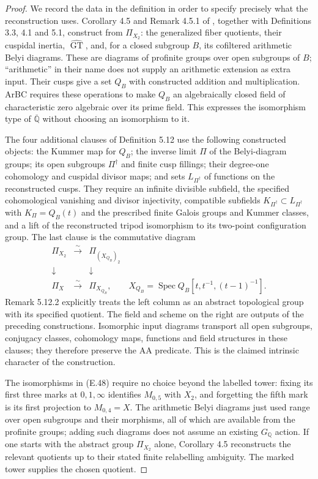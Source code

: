 \begin{proof}
We record the data in the definition in order to specify
precisely what the reconstruction uses.  Corollary 4.5 and
Remark 4.5.1 of \cite{ET_HMT2025}, together with
Definitions 3.3, 4.1 and 5.1, construct from $\Pi_{X_2}$:
the generalized fiber quotients, their cuspidal inertia,
$\widehat{\operatorname{GT}}$, and, for a closed subgroup
$B$, its cofiltered arithmetic Belyi diagrams.  These are
diagrams of profinite groups over open subgroups of $B$;
``arithmetic'' in their name does not supply an arithmetic
extension as extra input.  Their cusps give a set $Q_B$
with constructed addition and multiplication.  ArBC requires
these operations to make $Q_B$ an algebraically closed field
of characteristic zero algebraic over its prime field.
This expresses the isomorphism type of
$\overline{\mathbb Q}$ without choosing an isomorphism to it.

The four additional clauses of Definition 5.12 use the
following constructed objects: the Kummer map for $Q_B$;
the inverse limit $\Pi$ of the Belyi-diagram groups; its
open subgroups $\Pi^\dagger$ and finite cusp fillings;
their degree-one cohomology and cuspidal divisor maps; and
sets $L_{\Pi^\dagger}$ of functions on the reconstructed
cusps.  They require an infinite divisible subfield,
the specified cohomological vanishing and divisor
injectivity, compatible subfields
$K_{\Pi^\dagger}\subset L_{\Pi^\dagger}$ with
$K_\Pi=Q_B(t)$ and the prescribed finite Galois groups
and Kummer classes, and a lift of the reconstructed
tripod isomorphism to its two-point configuration group.
The last clause is the commutative diagram
\[
\begin{array}{ccc}
 \Pi_{X_2}&\xrightarrow{\sim}&\Pi_{(X_{Q_B})_2}\\
 \downarrow&&\downarrow\\
 \Pi_X&\xrightarrow{\sim}&\Pi_{X_{Q_B}},
 \qquad X_{Q_B}=\operatorname{Spec}Q_B[t,t^{-1},(t-1)^{-1}].
\end{array}                                                    \tag{E.49}
\]
Remark 5.12.2 explicitly treats the left column as an
abstract topological group with its specified quotient.
The field and scheme on the right are outputs of the
preceding constructions.  Isomorphic input diagrams
transport all open subgroups, conjugacy classes, cohomology
maps, functions and field structures in these clauses;
they therefore preserve the AA predicate.  This is the
claimed intrinsic character of the construction.

The isomorphisms in (E.48) require no choice beyond the
labelled tower: fixing its first three marks at
$0,1,\infty$ identifies $M_{0,5}$ with $X_2$, and
forgetting the fifth mark is its first projection to
$M_{0,4}=X$.  The arithmetic Belyi diagrams just used
range over open subgroups and their morphisms, all of
which are available from the profinite groups; adding
such diagrams does not assume an existing $G_{\mathbb Q}$
action.  If one starts with the abstract group
$\Pi_{X_2}$ alone, Corollary 4.5 reconstructs the
relevant quotients up to their stated finite relabelling
ambiguity.  The marked tower supplies the chosen quotient.


\end{proof}
